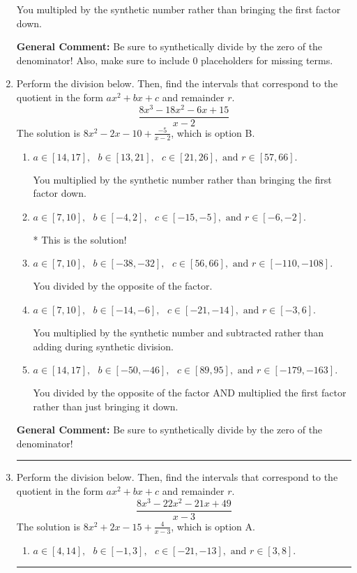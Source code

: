 \documentclass{extbook}[14pt]
\newcommand{\litem}[1]{\item #1

\rule{\textwidth}{0.4pt}}
\begin{document}
\begin{enumerate}
{\begin{enumerate}[label=\Alph*.]
 You multipled by the synthetic number rather than bringing the first factor down.
\end{enumerate}

\textbf{General Comment:} Be sure to synthetically divide by the zero of the denominator! Also, make sure to include 0 placeholders for missing terms.
}
\litem{
Perform the division below. Then, find the intervals that correspond to the quotient in the form $ax^2+bx+c$ and remainder $r$.
\[ \frac{8x^{3} -18 x^{2} -6 x + 15}{x -2} \]The solution is \( 8x^{2} -2 x -10 + \frac{-5}{x -2} \), which is option B.\begin{enumerate}[label=\Alph*.]
\item \( a \in [14, 17], \text{   } b \in [13, 21], \text{   } c \in [21, 26], \text{   and   } r \in [57, 66]. \)

 You multiplied by the synthetic number rather than bringing the first factor down.
\item \( a \in [7, 10], \text{   } b \in [-4, 2], \text{   } c \in [-15, -5], \text{   and   } r \in [-6, -2]. \)

* This is the solution!
\item \( a \in [7, 10], \text{   } b \in [-38, -32], \text{   } c \in [56, 66], \text{   and   } r \in [-110, -108]. \)

 You divided by the opposite of the factor.
\item \( a \in [7, 10], \text{   } b \in [-14, -6], \text{   } c \in [-21, -14], \text{   and   } r \in [-3, 6]. \)

 You multiplied by the synthetic number and subtracted rather than adding during synthetic division.
\item \( a \in [14, 17], \text{   } b \in [-50, -46], \text{   } c \in [89, 95], \text{   and   } r \in [-179, -163]. \)

 You divided by the opposite of the factor AND multiplied the first factor rather than just bringing it down.
\end{enumerate}

\textbf{General Comment:} Be sure to synthetically divide by the zero of the denominator!
}
\litem{
Perform the division below. Then, find the intervals that correspond to the quotient in the form $ax^2+bx+c$ and remainder $r$.
\[ \frac{8x^{3} -22 x^{2} -21 x + 49}{x -3} \]The solution is \( 8x^{2} +2 x -15 + \frac{4}{x -3} \), which is option A.\begin{enumerate}[label=\Alph*.]
\item \( a \in [4, 14], \text{   } b \in [-1, 3], \text{   } c \in [-21, -13], \text{   and   } r \in [3, 8]. \)


\end{enumerate}}
\end{enumerate}
\end{document}
